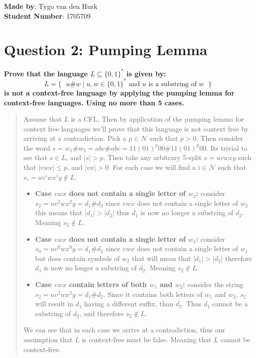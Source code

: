 \documentclass[a4paper]{article}
\begin{document}
    \setlength{\parskip}{0.5em}
    \setlength{\parindent}{0cm}
    \textbf{Made by}: Tygo van den Hurk \\
    \textbf{Student Number}: 1705709 \\
    \section*{Question 2: Pumping Lemma}
        \textbf{Prove that the language $L \subseteq \{0,1\}^\ast$ is given by:}
        \begin{displaymath} %
            L = \{\text{ }
                u\#w  \mid u, w \in \{0, 1\}^* \text{ and } u \text{ is a substring of } w
            \text{ }\}
        \end{displaymath}
        \textbf{is not a context-free language by applying the pumping lemma for context-free languages. Using no more than 5 cases.}
        \medskip
        \begin{quote}
            Assume that $L$ is a CFL. Then by application of the pumping lemma for context free languages we'll prove that this language is not context free by arriving at a contradiction. Pick a $p\in\mathcal{N}$ such that $p > 0$. Then consider the word $s = w_1\#w_2 = abc\#abc = 11(01)^p00\#11(01)^p00$. Its trivial to see that $s\in L$, and $|s| > p$. Then take any arbitrary 5-split $s = uvwxy$ such that $|vwx| \leqslant p$, and $|vx| > 0$. For each case we will find a $i\in \mathcal{N}$ such that $s_i = uv^iwx^iy \not\in L$.
            \begin{itemize}
                \item \textbf{Case $vwx$ does not contain a single letter of $w_2$:} consider $s_2 = uv^2wx^2y = d_1\#d_2$ since $vwx$ does not contain a single letter of $w_2$ this means that $|d_1| > |d_2|$ thus $d_1$ is now no longer a substring of $d_2$. Meaning $s_2 \not\in L$.
                \item \textbf{Case $vwx$ does not contain a single letter of $w_1$:} consider $s_0 = uv^0wx^0y = d_1\#d_2$ since $vwx$ does not contain a single letter of $w_1$ but does contain symbols of $w_2$ that will mean that $|d_1| > |d_2|$ therefore $d_1$ is now no longer a substring of $d_2$. Meaning $s_2 \not\in L$.
                \item \textbf{Case $vwx$ contain letters of both $w_1$ and $w_2$:} consider the string $s_2 = uv^2wx^2y = d_1\#d_2$. Since it contains both letters of $w_1$ and $w_2$, $s_2$ will result in $d_1$ having a different suffix, than $d_2$. Thus $d_1$ cannot be a substring of $d_2$, and therefore $s_2\not\in L$.
            \end{itemize}
            We can see that in each case we arrive at a contradiction, thus our assumption that $L$ is context-free must be false. Meaning that $L$ cannot be context-free.
        \end{quote}
\end{document}
